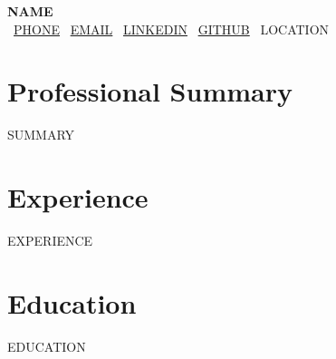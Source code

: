 \documentclass[10pt,letterpaper]{article}
\newcommand{\expentry}[4]{%
  \par\nobreak\vspace{4pt}%
  \textbf{#2 | #1}\\[1pt]%
  \textit{#3}\hfill\textbf{#4}%
  \par\nopagebreak\vspace{1pt}%
}
\newcommand{\eduentry}[4]{%
  \par\nobreak\vspace{4pt}%
  \textbf{#2 | #1}\\[1pt]%
  \textit{#3}\hfill\textbf{#4}%
  \par\nopagebreak\vspace{1pt}%
}
\begin{document}
\begin{center}
  {\Huge\textbf{{{NAME}}}}\\[5pt]
  \normalsize
  \mbox{\faPhone\ \href{tel:{{PHONE}}}{{{PHONE}}}} \quad
  \mbox{\faEnvelope\ \href{mailto:{{EMAIL}}}{{{EMAIL}}}} \quad
  \mbox{\faLinkedin\ \href{https://linkedin.com/in/{{LINKEDIN}}}{{{LINKEDIN}}}} \quad
  \mbox{\faGithub\ \href{https://github.com/{{GITHUB}}}{{{GITHUB}}}} \quad
  \mbox{\faMapMarker\ {{LOCATION}}}
\end{center}

\vspace{2pt}

\section{Professional Summary}
\RaggedRight
{{SUMMARY}}

\section{Experience}
{{EXPERIENCE}}

\section{Education}
{{EDUCATION}}
\end{document}
